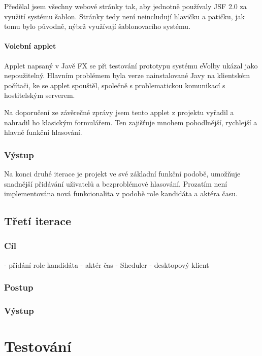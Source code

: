 \documentclass[11pt,twoside,a4paper]{book}
\begin{document}
Předělal jsem všechny webové stránky tak, aby jednotně používaly JSF 2.0 za využití systému šablon. Stránky tedy není neincludují hlavičku a patičku, jak tomu bylo původně, nýbrž využívají šablonovacího systému.

\subsubsection{Volební applet}

Applet napsaný v Javě FX se při testování prototypu systému eVolby\cite{www:prototyp} ukázal jako nepoužitelný. Hlavním problémem byla verze nainstalované Javy na klientském počítači, ke se applet spouštěl, společně s problematickou komunikací s hostitelským serverem.

Na doporučení ze závěrečné zprávy jsem tento applet z projektu vyřadil a nahradil ho klasickým formulářem. Ten zajišťuje mnohem pohodlnější, rychlejší a hlavně funkční hlasování.

\subsection{Výstup}

Na konci druhé iterace je projekt ve své základní funkční podobě, umožňuje snadnější přidávání uživatelů a bezproblémové hlasování. Prozatím není implementována nová funkcionalita v podobě role kandidáta a aktéra času.

\section{Třetí iterace}

\subsection{Cíl}

- přidání role kandidáta
- aktér čas - Sheduler
- desktopový klient

\subsection{Postup}

\subsection{Výstup}


\chapter{Testování}
\end{document}

